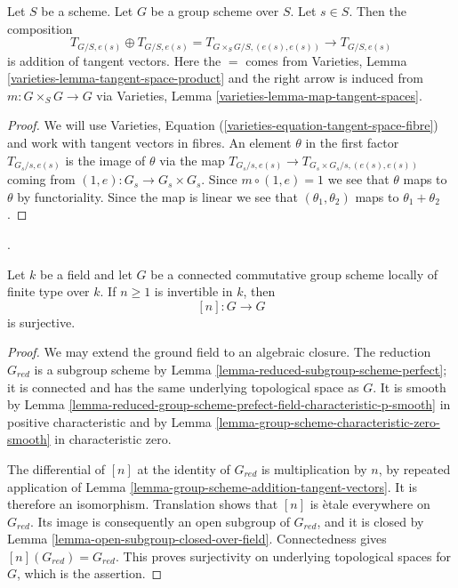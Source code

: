 \begin{lemma}
\label{lemma-group-scheme-addition-tangent-vectors}
Let $S$ be a scheme. Let $G$ be a group scheme over $S$.
Let $s \in S$. Then the composition
$$
T_{G/S, e(s)} \oplus T_{G/S, e(s)} = T_{G \times_S G/S, (e(s), e(s))}
\rightarrow T_{G/S, e(s)}
$$
is addition of tangent vectors. Here the $=$ comes from
Varieties, Lemma \ref{varieties-lemma-tangent-space-product}
and the right arrow is induced from $m : G \times_S G \to G$ via
Varieties, Lemma \ref{varieties-lemma-map-tangent-spaces}.
\end{lemma}

\begin{proof}
We will use Varieties, Equation (\ref{varieties-equation-tangent-space-fibre})
and work with tangent vectors in fibres.
An element $\theta$ in the first factor $T_{G_s/s, e(s)}$
is the image of $\theta$ via the map
$T_{G_s/s, e(s)} \to T_{G_s \times G_s/s, (e(s), e(s))}$
coming from $(1, e) : G_s \to G_s \times G_s$.
Since $m \circ (1, e) = 1$ we see that $\theta$ maps to $\theta$
by functoriality. Since the map is linear we see that
$(\theta_1, \theta_2)$ maps to $\theta_1 + \theta_2$.
\end{proof}

\begin{lemma}
\label{lemma-connected-group-power-surjective}
\begin{reference}
\cite[Expos\'e 236, proof of Theorem 1.1(iv), p. 227]{FGA}.
\end{reference}
Let $k$ be a field and let $G$ be a connected commutative group scheme
locally of finite type over $k$. If $n \geq 1$ is invertible in $k$, then
$$
[n] : G \longrightarrow G
$$
is surjective.
\end{lemma}

\begin{proof}
We may extend the ground field to an algebraic closure. The reduction
$G_{red}$ is a subgroup scheme by
Lemma \ref{lemma-reduced-subgroup-scheme-perfect}; it is connected and has
the same underlying topological space as $G$. It is smooth by
Lemma \ref{lemma-reduced-group-scheme-prefect-field-characteristic-p-smooth}
in positive characteristic and by
Lemma \ref{lemma-group-scheme-characteristic-zero-smooth} in characteristic
zero.

The differential of $[n]$ at the identity of $G_{red}$ is multiplication
by $n$, by repeated application of
Lemma \ref{lemma-group-scheme-addition-tangent-vectors}. It is therefore an
isomorphism. Translation shows that $[n]$ is \`etale everywhere on
$G_{red}$. Its image is consequently an open subgroup of $G_{red}$, and it
is closed by Lemma \ref{lemma-open-subgroup-closed-over-field}. Connectedness
gives $[n](G_{red})=G_{red}$. This proves surjectivity on underlying
topological spaces for $G$, which is the assertion.
\end{proof}

